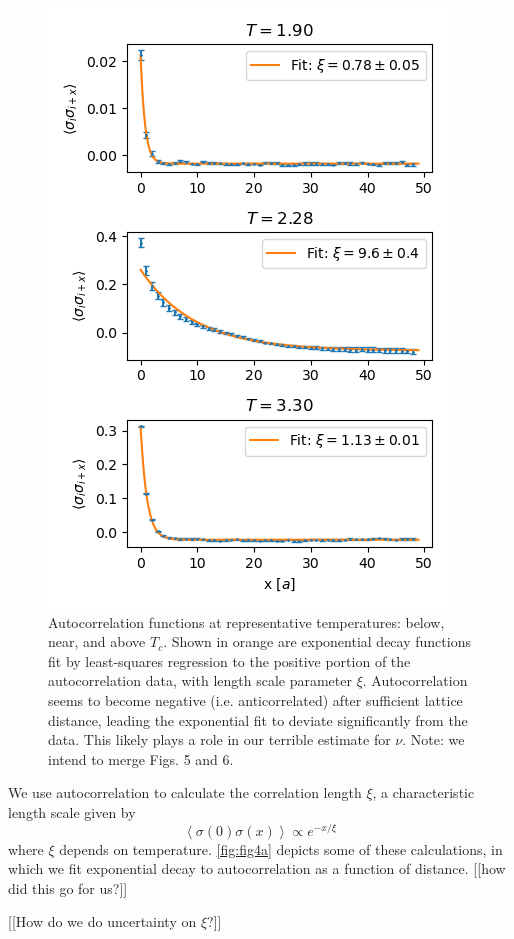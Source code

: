 \documentclass[letter,scriptaddress,twocolumn, prl,nofootinbib]{revtex4}
\newcommand{\submin}[1]{\left\langle #1 \right\rangle}
\begin{document}
\begin{figure}[h]
	\begin{center}
		\includegraphics[width=.4\textwidth]{figs/fig4_autocors.png}
		\caption{Autocorrelation functions at representative temperatures: below, near, and above $T_c$. Shown in orange are exponential decay functions fit by least-squares regression to the positive portion of the autocorrelation data, with length scale parameter $\xi$. Autocorrelation seems to become negative (i.e. anticorrelated) after sufficient lattice distance, leading the exponential fit to deviate significantly from the data. This likely plays a role in our terrible estimate for $\nu$. Note: we intend to merge Figs. 5 and 6.}
		\label{fig:fig4a}
	\end{center}
\end{figure}

We use autocorrelation to calculate the correlation length $\xi$, a characteristic length scale given by
\begin{equation}
	\label{eq:xi}
	\submin{\sigma(0)\sigma(x)} \propto e^{-x/\xi}
\end{equation}
where $\xi$ depends on temperature. \autoref{fig:fig4a} depicts some of these calculations, in which we fit exponential decay to autocorrelation as a function of distance. [[how did this go for us?]]

[[How do we do uncertainty on $\xi$?]]
\end{document}
